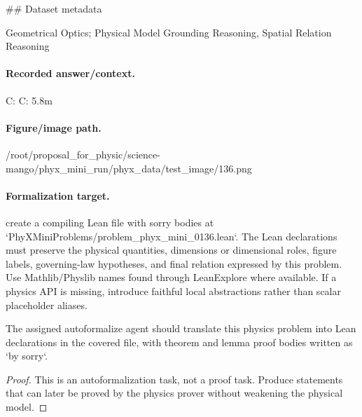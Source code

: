 \#\# Dataset metadata

Geometrical Optics; Physical Model Grounding Reasoning, Spatial Relation Reasoning

\paragraph{Recorded answer/context.}
C: C: 5.8m

\paragraph{Figure/image path.}
/root/proposal\_for\_physic/science-mango/phyx\_mini\_run/phyx\_data/test\_image/136.png

\paragraph{Formalization target.}
create a compiling Lean file with sorry bodies at `PhyXMiniProblems/problem\_phyx\_mini\_0136.lean`. The Lean declarations must preserve the physical quantities, dimensions or dimensional roles, figure labels, governing-law hypotheses, and final relation expressed by this problem.
Use Mathlib/Physlib names found through LeanExplore where available. If a physics API is missing, introduce faithful local abstractions rather than scalar placeholder aliases.

\begin{theorem}
\label{thm:physics:phyx_mini_0136:target}
The assigned autoformalize agent should translate this physics problem into Lean declarations in the covered file, with theorem and lemma proof bodies written as `by sorry`.
\end{theorem}
\begin{proof}
This is an autoformalization task, not a proof task. Produce statements that can later be proved by the physics prover without weakening the physical model.
\end{proof}


